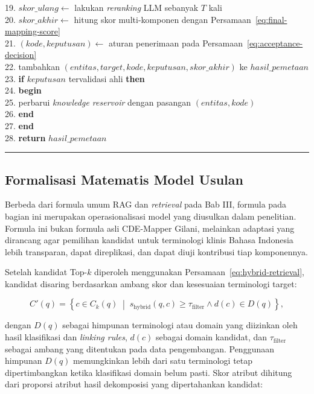 \begin{center}
\begin{minipage}{0.96\textwidth}
\begin{tabbing}
19. \>\> $skor\_ulang \leftarrow$ lakukan \textit{reranking} LLM sebanyak $T$ kali\\
20. \>\> $skor\_akhir \leftarrow$ hitung skor multi-komponen dengan Persamaan~\ref{eq:final-mapping-score}\\
21. \>\> $(kode, keputusan) \leftarrow$ aturan penerimaan pada Persamaan~\ref{eq:acceptance-decision}\\
22. \>\> tambahkan $(entitas, target, kode, keputusan, skor\_akhir)$ ke $hasil\_pemetaan$\\
23. \>\> \textbf{if} $keputusan$ tervalidasi ahli \textbf{then}\\
24. \>\> \textbf{begin}\\
25. \>\>\> perbarui \textit{knowledge reservoir} dengan pasangan $(entitas, kode)$\\
26. \>\> \textbf{end}\\
27. \> \textbf{end}\\
28. \> \textbf{return} $hasil\_pemetaan$
\end{tabbing}
\vspace{0.2em}
\hrule
\end{minipage}
\end{center}

\subsection{Formalisasi Matematis Model Usulan}

Berbeda dari formula umum RAG dan \textit{retrieval} pada Bab III, formula pada bagian ini merupakan operasionalisasi model yang diusulkan dalam penelitian. Formula ini bukan formula asli CDE-Mapper Gilani, melainkan adaptasi yang dirancang agar pemilihan kandidat untuk terminologi klinis Bahasa Indonesia lebih transparan, dapat direplikasi, dan dapat diuji kontribusi tiap komponennya.

Setelah kandidat Top-$k$ diperoleh menggunakan Persamaan~\ref{eq:hybrid-retrieval}, kandidat disaring berdasarkan ambang skor dan kesesuaian terminologi target:

\begin{equation}
C'(q)=\left\{c\in C_k(q)\;\middle|\;
s_{\mathrm{hybrid}}(q,c)\geq\tau_{\mathrm{filter}}
\land d(c)\in D(q)\right\},
\label{eq:candidate-filtering}
\end{equation}

dengan $D(q)$ sebagai himpunan terminologi atau domain yang diizinkan oleh hasil klasifikasi dan \textit{linking rules}, $d(c)$ sebagai domain kandidat, dan $\tau_{\mathrm{filter}}$ sebagai ambang yang ditentukan pada data pengembangan. Penggunaan himpunan $D(q)$ memungkinkan lebih dari satu terminologi tetap dipertimbangkan ketika klasifikasi domain belum pasti. Skor atribut dihitung dari proporsi atribut hasil dekomposisi yang dipertahankan kandidat:

